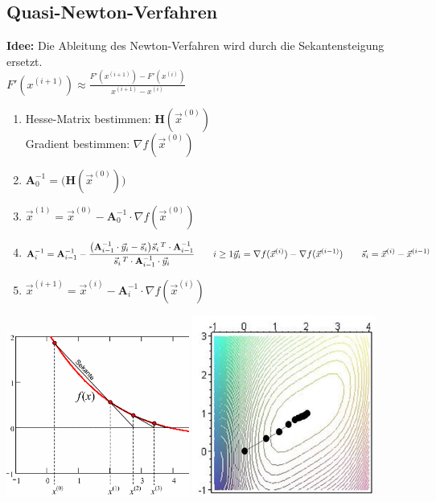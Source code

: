 \subsection{Quasi-Newton-Verfahren}
  \begin{minipage}{13cm}
  \textbf{Idee:} Die Ableitung des Newton-Verfahren wird durch die Sekantensteigung ersetzt.\\
  
  $F'(x^{(i+1)})\approx\frac{F'(x^{(i+1)})-F'(x^{(i)})}{x^{(i+1)}-x^{(i)}}$\\
  
 \begin{enumerate}
 \item Hesse-Matrix bestimmen: $\mathbf{H}(\vec{x}^{(0)})$\\
 Gradient bestimmen: $\nabla f(\vec{x}^{(0)})$
 \item $\mathbf{A}_{0}^{-1}=\bigl(\mathbf{H}(\vec{x}^{(0)})\bigr)$
 \item $\vec{x}^{(1)}=\vec{x}^{(0)}-\mathbf{A}_{0}^{-1}\cdot\nabla f(\vec{x}^{(0)})$
 \item $\mathbf{A}_{i}^{-1}=\mathbf{A}_{i-1}^{-1}-\displaystyle\frac{\bigl(\mathbf{A}_{i-1}^{-1}\cdot \vec{y}_i-\vec{s}_i\bigr)\vec{s}_i\,^T\cdot \mathbf{A}_{i-1}^{-1}}{\vec{s}_i\,^T\cdot \mathbf{A}_{i-1}^{-1}\cdot\vec{y}_i}\qquad i\geq 1\\
 \vec{y}_i=\nabla f(\vec{x}^{(i)})-\nabla f(\vec{x}^{(i-1)})\qquad \vec{s}_i=\vec{x}^{(i)}-\vec{x}^{(i-1)}$
 \item $\vec{x}^{(i+1)}=\vec{x}^{(i)}-\mathbf{A}_{i}^{-1}\cdot\nabla f(\vec{x}^{(i)})$
 \end{enumerate}
 
\end{minipage}
\begin{minipage}{6cm}
   \includegraphics[width=6cm]{./Content/NonLinearOptimization/QuasiNewton1D}
   \includegraphics[width=6cm]{./Content/NonLinearOptimization/newton}
\end{minipage}


